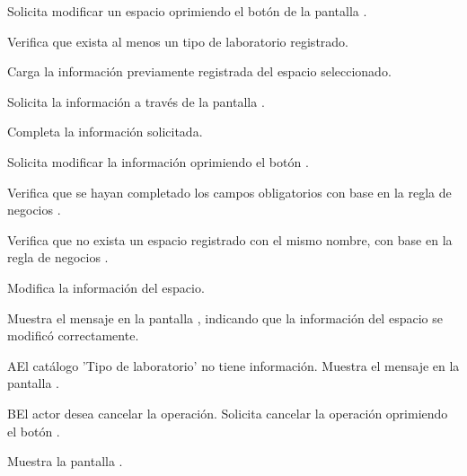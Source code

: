 \begin{UCtrayectoria}
	\UCpaso [\UCactor] Solicita modificar un espacio oprimiendo el botón  de la pantalla . 
	
	\UCpaso [\UCsist] Verifica que exista al menos un tipo de laboratorio registrado. 

	\UCpaso [\UCsist] Carga la información previamente registrada del espacio seleccionado.

	\UCpaso[\UCsist] Solicita la información a través de la pantalla .
	
	\UCpaso [\UCactor] Completa la información solicitada. \label{CUI1.5.2:CompletaInfo}
	
	\UCpaso [\UCactor] Solicita modificar la información oprimiendo el botón . 
	
	\UCpaso [\UCsist] Verifica que se hayan completado los campos obligatorios con base en la regla de negocios . 
		
	\UCpaso [\UCsist] Verifica que no exista un espacio registrado con el mismo nombre, con base en la regla de negocios . 
	
	\UCpaso [\UCsist] Modifica la información del espacio.
	
	\UCpaso [\UCsist] Muestra el mensaje  en la pantalla , indicando que la información del espacio se modificó correctamente.	
	
\end{UCtrayectoria}

\begin{UCtrayectoriaA}{A}{El catálogo 'Tipo de laboratorio' no tiene información.}
	\UCpaso [\UCsist] Muestra el mensaje  en la pantalla . 
\end{UCtrayectoriaA}

\begin{UCtrayectoriaA}{B}{El actor desea cancelar la operación.}
	\UCpaso [\UCactor] Solicita cancelar la operación oprimiendo el botón .
	
	\UCpaso [\UCsist] Muestra la pantalla . 
\end{UCtrayectoriaA}

